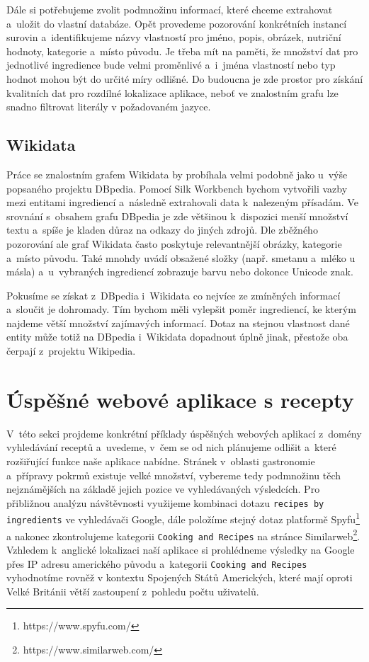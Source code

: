 Dále si potřebujeme zvolit podmnožinu informací, které chceme extrahovat a~uložit do vlastní databáze. Opět provedeme pozorování konkrétních instancí surovin a~identifikujeme názvy vlastností pro jméno, popis, obrázek, nutriční hodnoty, kategorie a~místo původu. Je třeba mít na paměti, že množství dat pro jednotlivé ingredience bude velmi proměnlivé a~i~jména vlastností nebo typ hodnot mohou být do určité míry odlišné. Do budoucna je zde prostor pro získání kvalitních dat pro rozdílné lokalizace aplikace, neboť ve znalostním grafu lze snadno filtrovat literály v požadovaném jazyce.

\subsection{Wikidata}

Práce se znalostním grafem Wikidata by probíhala velmi podobně jako u~výše popsaného projektu DBpedia. Pomocí Silk Workbench bychom vytvořili vazby mezi entitami ingrediencí a~následně extrahovali data k~nalezeným přísadám. Ve srovnání s~obsahem grafu DBpedia je zde většinou k~dispozici menší množství textu a~spíše je kladen důraz na odkazy do jiných zdrojů. Dle zběžného pozorování ale graf Wikidata často poskytuje relevantnější obrázky, kategorie a~místo původu. Také mnohdy uvádí obsažené složky (např. smetanu a~mléko u másla) a~u~vybraných ingrediencí zobrazuje barvu nebo dokonce Unicode znak.

Pokusíme se získat z~DBpedia i~Wikidata co nejvíce ze zmíněných informací a~sloučit je dohromady. Tím bychom měli vylepšit poměr ingrediencí, ke kterým najdeme větší množství zajímavých informací. Dotaz na stejnou vlastnost dané entity může totiž na DBpedia i~Wikidata dopadnout úplně jinak, přestože oba čerpají z~projektu Wikipedia.

\section{Úspěšné webové aplikace s recepty}

V~této sekci projdeme konkrétní příklady úspěšných webových aplikací z~domény vyhledávání receptů a~uvedeme, v~čem se od nich plánujeme odlišit a~které rozšiřující funkce naše aplikace nabídne. Stránek v~oblasti gastronomie a~přípravy pokrmů existuje velké množství, vybereme tedy podmnožinu těch nejznámějších na základě jejich pozice ve vyhledávaných výsledcích. Pro přibližnou analýzu návštěvnosti využijeme kombinaci dotazu \texttt{recipes by ingredients} ve vyhledávači Google, dále položíme stejný dotaz platformě Spyfu\footnote{https://www.spyfu.com/} a nakonec zkontrolujeme kategorii \texttt{Cooking and Recipes} na stránce Similarweb\footnote{https://www.similarweb.com/}. Vzhledem k~anglické lokalizaci naší aplikace si prohlédneme výsledky na Google přes IP adresu amerického původu a~kategorii \texttt{Cooking and Recipes} vyhodnotíme rovněž v kontextu Spojených Států Amerických, které mají oproti Velké Británii větší zastoupení z~pohledu počtu uživatelů.

